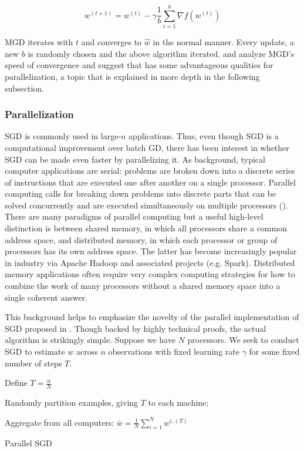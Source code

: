 \documentclass{article}
\begin{document}
\begin{equation}
	w^{(t+1)} = w^{(t)} - \gamma \frac{1}{b} \sum_{i=1}^b \nabla f(w^{(t)})
\end{equation}

MGD iterates with $t$ and converges to $\hat{w}$ in the normal manner. Every
update, a new $b$ is randomly chosen and the above algorithm iterated. 
\cite{dekel2012optimal} and \cite{li2014efficient} analyze MGD's speed of
convergence and suggest that has some advantageous qualities for
parallelization, a topic that is explained in more depth in the following
subsection.

\subsubsection{Parallelization}

SGD is commonly used in large-$n$ applications. Thus,
even though SGD is a computational improvement over batch GD, there has been
interest in whether SGD can be made even faster by parallelizing it. As
background, typical computer applications are serial: problems are broken
down into a discrete series of instructions that are executed one after another
on a single processor. Parallel computing calls for breaking down problems into discrete parts that can
be solved concurrently and are executed simultaneously on multiple processors
(\cite{barney2010introduction}).
There are many paradigms of parallel computing but a useful high-level
distinction is between shared memory, in which all processors share a common
address space, and distributed memory, in which each processor or group of processors
has its own address space. The latter has become increasingly popular in
industry via Apache Hadoop and associated projects (e.g. Spark). Distributed
memory applications often require very complex computing strategies for how to combine the
work of many processors without a shared memory space into a single coherent answer.

This background helps to emphasize the novelty of the parallel
implementation of SGD proposed in \cite{zinkevich2010parallelized}. Though backed
by highly technical proofs, the actual algorithm is strikingly simple. Suppose we have $N$ processors. We seek to
conduct SGD to estimate $w$ across $n$ observations with fixed learning rate
$\gamma$ for some fixed number of steps $T$.

\medskip

\begin{algorithm}[H]
	Define $T = \frac{n}{N}$\;

	Randomly partition examples, giving $T$ to each machine;\

	Aggregate from all computers: $\bar{w} = \frac{1}{N} \sum_{i=1}^{N}
	w^{i, (T)}$ \;


	\caption{Parallel SGD}
\end{algorithm}
\end{document}
